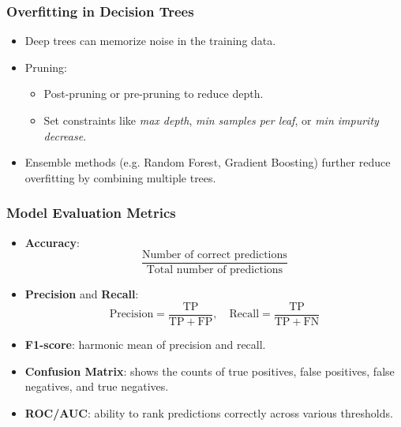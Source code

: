 \documentclass[aspectratio=169]{beamer}
\begin{document}
\begin{frame}
    \frametitle{Overfitting in Decision Trees}
    \begin{itemize}
        \item Deep trees can memorize noise in the training data.
        \item Pruning:
        \begin{itemize}
            \item Post-pruning or pre-pruning to reduce depth.
            \item Set constraints like \textit{max depth}, \textit{min samples per leaf}, or \textit{min impurity decrease}.
        \end{itemize}
        \item Ensemble methods (e.g. Random Forest, Gradient Boosting) further reduce overfitting by combining multiple trees.
    \end{itemize}
\end{frame}

\begin{frame}
    \frametitle{Model Evaluation Metrics}
    \begin{itemize}
        \item \textbf{Accuracy}:
        \[
            \frac{\text{Number of correct predictions}}{\text{Total number of predictions}}
        \]
        \item \textbf{Precision} and \textbf{Recall}:
        \[
            \text{Precision} = \frac{\mathrm{TP}}{\mathrm{TP} + \mathrm{FP}}, \quad
            \text{Recall} = \frac{\mathrm{TP}}{\mathrm{TP} + \mathrm{FN}}
        \]
        \item \textbf{F1-score}: harmonic mean of precision and recall.
        \item \textbf{Confusion Matrix}: shows the counts of true positives, false positives, false negatives, and true negatives.
        \item \textbf{ROC/AUC}: ability to rank predictions correctly across various thresholds.
    \end{itemize}
\end{frame}
\end{document}
